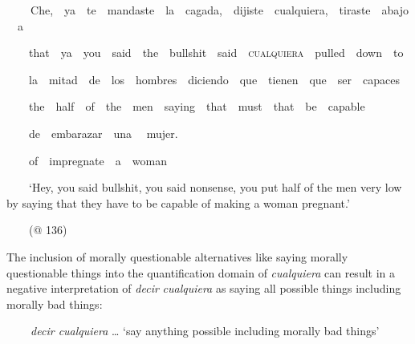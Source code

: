 \begin{styleStandard}
\textbf{\ \ }\ \ Che,\ \ ya\ \ te\ \ mandaste\ \ la\ \ cagada,\ \ dijiste\ \ cualquiera,\ \ tiraste\ \ abajo\ \ a
\end{styleStandard}

\begin{styleStandard}
\ \ \ \ that\ \ ya\ \ you\ \ said\ \ the\ \ bullshit\ \ said\ \ \textsc{cualquiera}\ \ pulled\ \ down\ \ to
\end{styleStandard}

\begin{styleStandard}
\ \ \ \ la\ \ mitad\ \ de\ \ los\ \ hombres\ \ diciendo\ \ que\ \ tienen\ \ que\ \ ser\ \ capaces
\end{styleStandard}

\begin{styleStandard}
\ \ \ \ the\ \ half\ \ of\ \ the\ \ men\ \ saying\ \ that\ \ must\ \ that\ \ be\ \ capable
\end{styleStandard}

\begin{styleStandard}
\ \ \ \ de\ \ embarazar\ \ una \ \ mujer.
\end{styleStandard}

\begin{styleStandard}
\ \ \ \ of\ \ impregnate\ \ a\ \ woman
\end{styleStandard}

\begin{styleStandard}
\ \ \ \ ‘Hey, you said bullshit, you said nonsense, you put half of the men very low by saying that they have to be capable of making a woman pregnant.’
\end{styleStandard}

\begin{styleStandard}
\ \ \ \ (@ 136)
\end{styleStandard}

\begin{styleStandard}
The inclusion of morally questionable alternatives like saying morally questionable things into the quantification domain of \textit{cualquiera} can result in a negative interpretation of \textit{decir} \textit{cualquiera} as saying all possible things including morally bad things:
\end{styleStandard}

\begin{styleStandard}
\textbf{\ \ }\ \ \textit{decir cualquiera} … ‘say anything possible including morally bad things’
\end{styleStandard}

